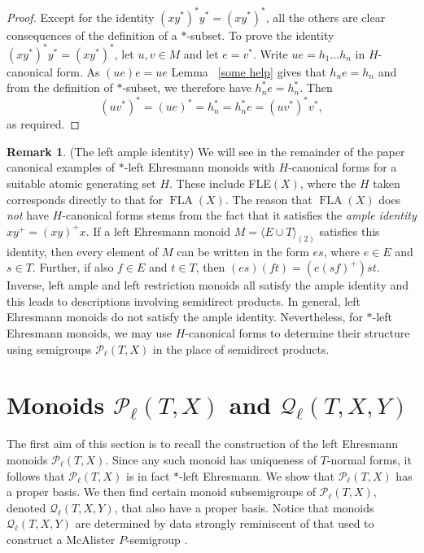 \documentclass[12pt]{amsart}
\theoremstyle{definition}
\newtheorem{rem}[them]{Remark}
\theoremstyle{definition}
\numberwithin{them}{section}
\numberwithin{equation}{section}
\newcommand{\QQ}{\mbox{$\mathcal{Q}_\ell$}}
\DeclareMathOperator{\FLA}{FLA}
\begin{document}
{{\begin{proof}
Except for the identity $(xy^*)^*y^*=(xy^*)^*$, all the others are clear consequences of  the definition 
of a $*$-subset. To prove the identity $(xy^*)^*y^*=(xy^*)^*$,  let $u,v\in M$ and let $e=v^*$. Write
$ue=h_1\dots h_n$  in $H$-canonical form. As $(ue)e=ue$ Lemma ~\ref{some help} gives that $h_ne=h_n$ and from the definition of $*$-subset, we therefore have $h_n^*e=h_n^*$. Then 
$$(uv^*)^* = 
(ue)^*=h_n^*=h_n^*e=(uv^*)^*v^*,$$
 as required.
\end{proof}


\begin{rem}\label{rem:ample}(The left ample identity) We will see in the remainder of the paper 
canonical examples of
$*$-left Ehresmann monoids with $H$-canonical forms for a suitable atomic generating set $H$. These  include FLE$(X)$, where the $H$ taken corresponds directly to that for $\FLA(X)$. The reason that $\FLA(X)$ does {\em not} have $H$-canonical forms stems from the fact that it satisfies the {\em ample identity} 
$xy^+=(xy)^+x$. If a left  Ehresmann monoid $M=\langle E\cup T\rangle_{(2)}$ satisfies this identity, then every element of $M$ can be written in the form   $es$, where $e\in E$ and $s\in T$. Further, if also $f\in E$ and $t\in T$, then $(es)(ft)=(e(sf)^+)st$.  Inverse, left ample and left restriction monoids all satisfy the ample  identity and this leads to descriptions involving semidirect products. In general, left Ehresmann monoids do not satisfy the ample identity. Nevertheless, for $*$-left Ehresmann monoids, we may use $H$-canonical forms to determine their structure using semigroups $\mathcal{P}_{\ell}(T,X)$ in the place of semidirect products. 
\end{rem}




\section{Monoids $\mathcal{P}_\ell(T,X)$ and $\QQ(T, X, Y)$} \label{sec:Q}


The first aim of this section is  to recall the construction of the left Ehresmann monoids $\mathcal{P}_{\ell}(T,X)$. Since any such monoid has uniqueness of $T$-normal forms, it follows that $\mathcal{P}_{\ell}(T,X)$ is in fact $*$-left Ehresmann. We show that $\mathcal{P}_{\ell}(T,X)$ has  a  proper  basis.  We then find certain monoid subsemigroups of 
$\mathcal{P}_{\ell}(T,X)$, denoted $\QQ(T, X, Y)$,  that also have a  proper  basis.  Notice that monoids $\QQ(T, X, Y)$  are determined by data strongly reminiscent of that used to construct a McAlister $P$-semigroup \cite{M1,M2}. 

}}
\end{document}
